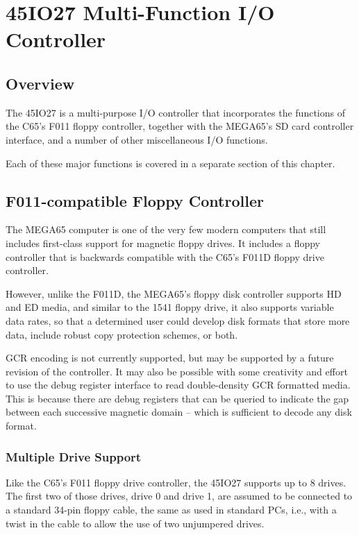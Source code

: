 \chapter{45IO27 Multi-Function I/O Controller}

\section{Overview}

The 45IO27 is a multi-purpose I/O controller that incorporates the functions of the
C65's F011 floppy controller, together with the MEGA65's SD card controller interface,
and a number of other miscellaneous I/O functions.

Each of these major functions is covered in a separate section of this chapter.

\section{F011-compatible Floppy Controller}

The MEGA65 computer is one of the very few modern computers that still
includes first-class support for magnetic floppy drives.  It includes
a floppy controller that is backwards compatible with the C65's F011D
floppy drive controller.

However, unlike the F011D, the MEGA65's
floppy disk controller supports HD and ED media, and similar to the
1541 floppy drive, it also supports variable data rates, so that a
determined user could develop disk formats that store more data,
include robust copy protection schemes, or both.

GCR encoding is not currently supported, but may be supported by a
future revision of the controller.  It may also be possible with some
creativity and effort to use the debug register interface to read
double-density GCR formatted media.  This is because there are debug
registers that can be queried to indicate the gap between each
successive magnetic domain -- which is sufficient to decode any disk
format. 

\subsection{Multiple Drive Support}

Like the C65's F011 floppy drive controller, the 45IO27 supports up to 8 drives.
The first two of those drives, drive 0 and drive 1, are assumed to be connected to a
standard 34-pin floppy cable, the same as used in standard PCs, i.e.,
with a twist in the cable to allow the use of two unjumpered drives.

